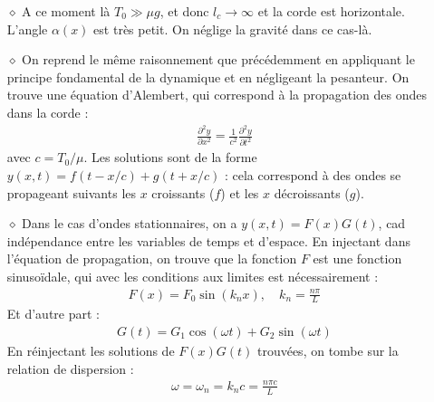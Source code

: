 \documentclass{report}
\begin{document}
\begin{itemize}

	\item[$\diamond$] A ce moment là $T_0\gg \mu g$, et donc $l_c\longrightarrow\infty$ et la corde est horizontale. L'angle $\alpha(x)$ est très petit. On néglige la gravité dans ce cas-là.

	\item[$\diamond$] On reprend le même raisonnement que précédemment en appliquant le principe fondamental de la dynamique et en négligeant la pesanteur. On trouve une équation d'Alembert, qui correspond à la propagation des ondes dans la corde :
	\begin{align*}
		\frac{\partial^2y}{\partial x^2}=\frac{1}{c^2}\frac{\partial^2y}{\partial t^2}
	\end{align*}
	avec $c=T_0/\mu$.
	Les solutions sont de la forme $y(x,t)=f(t-x/c)+g(t+x/c)$ : cela correspond à des ondes se propageant suivants les $x$ croissants ($f$) et les $x$ décroissants ($g$).
	
	\item[$\diamond$] Dans le cas d'ondes stationnaires, on a $y(x,t)=F(x)G(t)$, cad indépendance entre les variables de temps et d'espace. En injectant dans l'équation de propagation, on trouve que la fonction $F$ est une fonction sinusoïdale, qui avec les conditions aux limites est nécessairement :
	\begin{align*}
		F(x)=F_0\sin(k_n x),\quad k_n=\frac{n\pi}{L}
	\end{align*}
	Et d'autre part :	
	\begin{align*}
		G(t)=G_1\cos(\omega t)+G_2\sin(\omega t)
	\end{align*}	
En réinjectant les solutions de $F(x)G(t)$ trouvées, on tombe sur la relation de dispersion :
	\begin{align*}
		\omega=\omega_n=k_nc=\frac{n\pi c}{L}
	\end{align*}	
	

\end{itemize}
\end{document}

